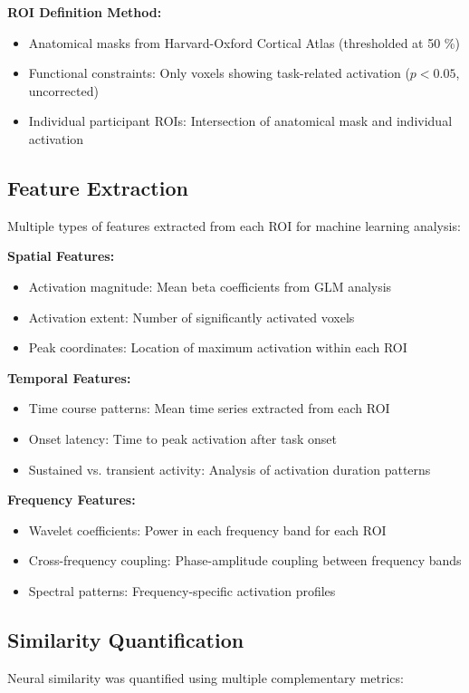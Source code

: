\documentclass[12pt, a4paper]{article}
\begin{document}
\noindent
\textbf{ROI Definition Method:}
\begin{itemize}
\item Anatomical masks from Harvard-Oxford Cortical Atlas (thresholded at 50 \%)
\item Functional constraints: Only voxels showing task-related activation ($p < 0.05$, uncorrected)
\item Individual participant ROIs: Intersection of anatomical mask and individual activation
\end{itemize}


\subsection{Feature Extraction}
Multiple types of features extracted from each ROI for machine learning analysis:

\vspace{0.5\baselineskip}
\noindent
\textbf{Spatial Features:}
\begin{itemize}
\item Activation magnitude: Mean beta coefficients from GLM analysis
\item Activation extent: Number of significantly activated voxels
\item Peak coordinates: Location of maximum activation within each ROI
\end{itemize}

\noindent
\textbf{Temporal Features:}
\begin{itemize}
\item Time course patterns: Mean time series extracted from each ROI
\item Onset latency: Time to peak activation after task onset
\item Sustained vs. transient activity: Analysis of activation duration patterns
\end{itemize}

\noindent
\textbf{Frequency Features:}
\begin{itemize}
\item Wavelet coefficients: Power in each frequency band for each ROI
\item Cross-frequency coupling: Phase-amplitude coupling between frequency bands
\item Spectral patterns: Frequency-specific activation profiles
\end{itemize}


\subsection{Similarity Quantification}
Neural similarity was quantified using multiple complementary metrics:
\end{document}
